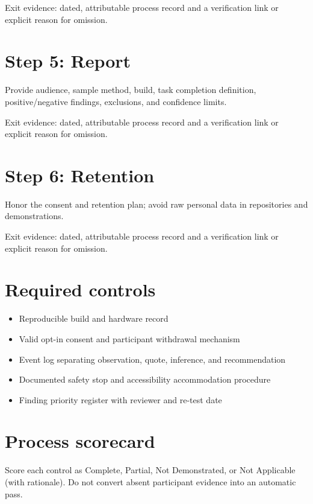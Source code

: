 \documentclass[11pt]{article}
\begin{document}
Exit evidence: dated, attributable process record and a verification link or explicit reason for omission.


\section{Step 5: Report}
Provide audience, sample method, build, task completion definition, positive/negative findings, exclusions, and confidence limits.

Exit evidence: dated, attributable process record and a verification link or explicit reason for omission.


\section{Step 6: Retention}
Honor the consent and retention plan; avoid raw personal data in repositories and demonstrations.

Exit evidence: dated, attributable process record and a verification link or explicit reason for omission.


\section{Required controls}
\begin{itemize}
\item Reproducible build and hardware record
\item Valid opt-in consent and participant withdrawal mechanism
\item Event log separating observation, quote, inference, and recommendation
\item Documented safety stop and accessibility accommodation procedure
\item Finding priority register with reviewer and re-test date
\end{itemize}

\section{Process scorecard}
Score each control as Complete, Partial, Not Demonstrated, or Not Applicable (with rationale). Do not convert absent participant evidence into an automatic pass.
\end{document}
